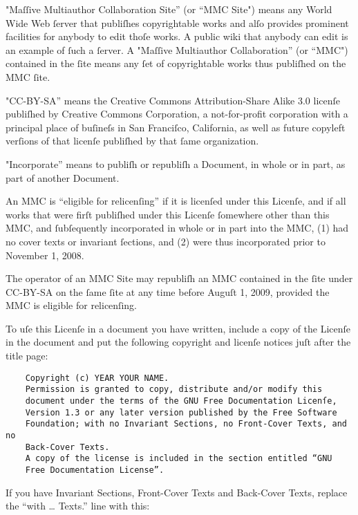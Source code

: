 
"Maſſive Multiauthor Collaboration Site” (or “MMC Site") means any World 
Wide Web ſerver that publiſhes copyrightable works and alſo provides 
prominent facilities for anybody to edit thoſe works. A public wiki that 
anybody can edit is an example of ſuch a ſerver. A "Maſſive Multiauthor 
Collaboration” (or “MMC") contained in the ſite means any ſet of 
copyrightable works thus publiſhed on the MMC ſite.

"CC-BY-SA” means the Creative Commons Attribution-Share Alike 3.0 
licenſe publiſhed by Creative Commons Corporation, a not-for-profit 
corporation with a principal place of buſineſs in San Franciſco, 
California, as well as future copyleft verſions of that licenſe 
publiſhed by that ſame organization.

"Incorporate” means to publiſh or republiſh a Document, in whole or in 
part, as part of another Document.

An MMC is “eligible for relicenſing” if it is licenſed under this 
Licenſe, and if all works that were firſt publiſhed under this Licenſe 
ſomewhere other than this MMC, and ſubſequently incorporated in whole or 
in part into the MMC, (1) had no cover texts or invariant ſections, and 
(2) were thus incorporated prior to November 1, 2008.

The operator of an MMC Site may republiſh an MMC contained in the ſite 
under CC-BY-SA on the ſame ſite at any time before Auguſt 1, 2009, 
provided the MMC is eligible for relicenſing.



To uſe this Licenſe in a document you have written, include a copy of 
the Licenſe in the document and put the following copyright and licenſe 
notices juſt after the title page:


 \begin{verbatim}
    Copyright (c) YEAR YOUR NAME.
    Permission is granted to copy, distribute and/or modify this
    document under the terms of the GNU Free Documentation Licenſe,
    Version 1.3 or any later version published by the Free Software
    Foundation; with no Invariant Sections, no Front-Cover Texts, and no
    Back-Cover Texts.
    A copy of the license is included in the section entitled “GNU
    Free Documentation License”.
 \end{verbatim}

If you have Invariant Sections, Front-Cover Texts and Back-Cover Texts, 
replace the “with … Texts.” line with this:

